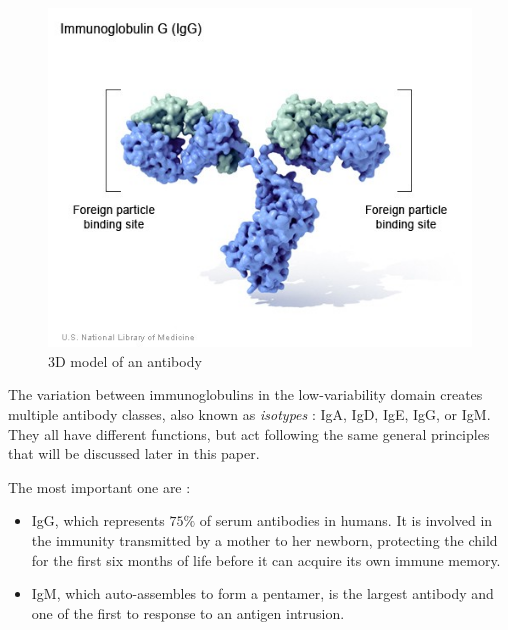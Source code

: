 \begin{figure}[!h]
\begin{minipage}{0.495\textwidth}
        \includegraphics[width=\textwidth]{../Images/immunoglobulin_3D_model.jpg}   
        \caption{3D model of an antibody}
        \label{fig:immunoglobulin_3D_model}
    \end{minipage}
\end{figure}


The variation between immunoglobulins in the low-variability domain
creates multiple antibody classes, also known as \emph{isotypes} :
IgA, IgD, IgE, IgG, or IgM. They all have different functions, but act
following the same general principles that will be discussed later in this paper.


The most important one are :
\begin{itemize}
    \item IgG, which represents $75\%$ of serum antibodies
    in humans. It is involved in the immunity transmitted by a mother
    to her newborn, protecting the child for the first six months of life
    before it can acquire its own immune memory.
    \item IgM, which auto-assembles to form a pentamer, is the largest
    antibody and one of the first to response to an antigen intrusion.
\end{itemize}



